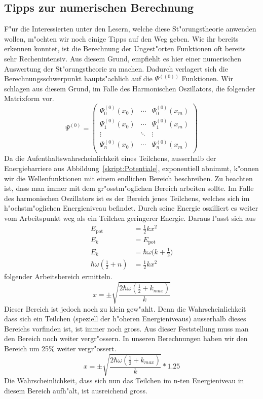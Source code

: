 \begin{refsection}
\subsection{Tipps zur numerischen Berechnung}
F"ur die Interessierten unter den Lesern,
welche diese St"orungstheorie anwenden wollen,
m"ochten wir noch einige Tipps auf den Weg geben.
Wie ihr bereits erkennen konntet,
ist die Berechnung der  Ungest"orten Funktionen oft bereits sehr Rechenintensiv.
Aus diesem Grund,
empfiehlt es hier einer numerischen Auswertung der St"orungstheorie zu machen.
Dadurch verlagert sich die Berechnungsschwerpunkt
haupts"achlich auf die $\Psi^{((0))}$ Funktionen.
Wir schlagen aus diesem Grund,
im Falle des Harmonischen Oszillators, die folgender Matrixform vor.
\[
\Psi^{(0)}
=
\begin{pmatrix}
\Psi_0^{(0)}(x_0) & \cdots & \Psi_0^{(0)}(x_m)	\\
\Psi_1^{(0)}(x_0) & \cdots & \Psi_1^{(0)}(x_m)	\\
\vdots & \ddots & \vdots			\\
\Psi_n^{(0)}(x_0) & \cdots & \Psi_n^{(0)}(x_m)	\\
\end{pmatrix}
\]
Da die  Aufenthaltswahrscheinlichkeit eines Teilchens,
ausserhalb der Energiebarriere aus Abbildung~\ref{skript:Potentiale},
exponentiell abnimmt,
k"onnen wir die Wellenfunktionen mit einem endlichen Bereich beschreiben.
Zu beachten ist,
dass man immer mit dem gr"osstm"oglichen Bereich arbeiten sollte.
Im Falle des harmonischen Oszillators ist es der Bereich jenes Teilchens,
welches sich im h"ochstm"oglichen Energieniveau befindet.
Durch seine Energie oszilliert es weiter vom Arbeitspunkt weg
als ein Teilchen geringerer Energie.
Daraus l"asst sich aus
\begin{align*} 
E_{\text{pot}}
&=
\frac12 kx^2
\\
E_k
&=
E_{\text{pot}}
\\
E_k
&=
\hbar\omega\biggl(k+\frac12\biggr)
\\
\hbar\omega(\frac12+n)
&=
\frac12 kx^2
\end{align*}
folgender Arbeitsbereich ermitteln.
\[
x
=
\pm\sqrt{\frac{2\hbar\omega(\frac12+k_{max})}k}
\]
Dieser Bereich ist jedoch noch zu klein gew"ahlt.
Denn die Wahrscheinlichkeit dass sich ein Teilchen
(speziell der h"oheren Energieniveaus) ausserhalb dieses Bereichs vorfinden ist,
ist immer noch gross.
Aus dieser Feststellung muss man den Bereich noch weiter vergr"ossern.
In unseren Berechnungen haben wir den Bereich um 25\% weiter vergr"ossert.
\[
x
=
\pm\sqrt{\frac{2\hbar\omega(\frac12+k_{max})}k}*1.25
\]
Die Wahrscheinlichkeit,
dass sich nun das Teilchen im n-ten Energieniveau in diesem Bereich aufh"alt,
ist ausreichend gross.



\end{refsection}
